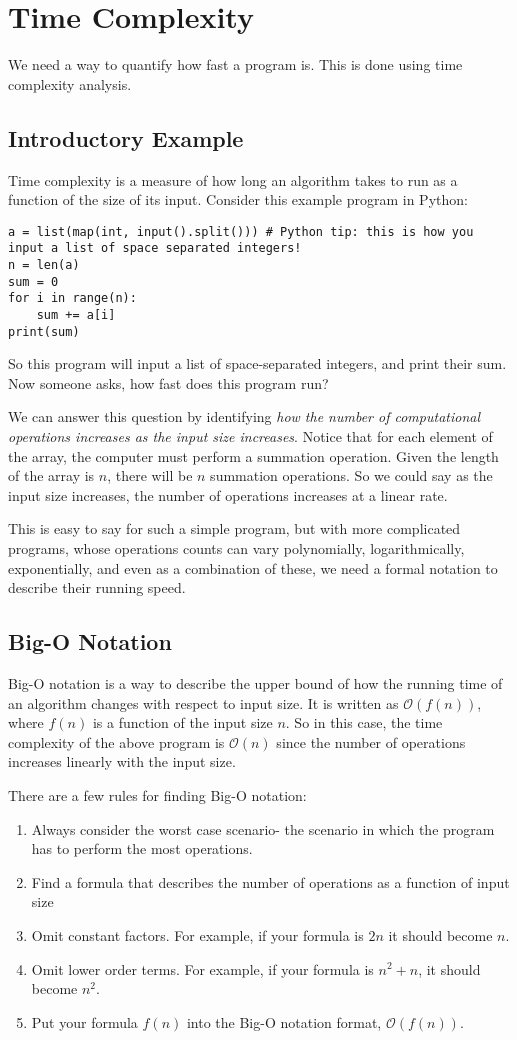 \documentclass{article}
\begin{document}
\section{Time Complexity}
We need a way to quantify how fast a program is. This is done using time complexity analysis.

\subsection{Introductory Example}
Time complexity is a measure of how long an algorithm takes to run as a function of the size of its input. Consider this example program in Python:
\begin{verbatim}
a = list(map(int, input().split())) # Python tip: this is how you input a list of space separated integers!
n = len(a)
sum = 0
for i in range(n):
    sum += a[i]
print(sum)
\end{verbatim}
So this program will input a list of space-separated integers, and print their sum. Now someone asks, how fast does this program run?

We can answer this question by identifying \textit{how the number of computational operations increases as the input size increases}. Notice that for each element of the array, the computer must perform a summation operation. Given the length of the array is $n$, there will be $n$ summation operations. So we could say as the input size increases, the number of operations increases at a linear rate.

This is easy to say for such a simple program, but with more complicated programs, whose operations counts can vary polynomially, logarithmically, exponentially, and even as a combination of these, we need a formal notation to describe their running speed.
\subsection{Big-O Notation}
Big-O notation is a way to describe the upper bound of how the running time of an algorithm changes with respect to input size. It is written as $\mathcal{O}(f(n))$, where $f(n)$ is a function of the input size $n$. So in this case, the time complexity of the above program is $\mathcal{O}(n)$ since the number of operations increases linearly with the input size.

There are a few rules for finding Big-O notation:
\begin{enumerate}
    \item Always consider the worst case scenario- the scenario in which the program has to perform the most operations.
    \item Find a formula that describes the number of operations as a function of input size
    \item Omit constant factors. For example, if your formula is $2n$ it should become $n$. 
    \item Omit lower order terms. For example, if your formula is $n^2 + n$, it should become $n^2$.
    \item Put your formula $f(n)$ into the Big-O notation format, $\mathcal{O}(f(n))$.
\end{enumerate}
\end{document}
